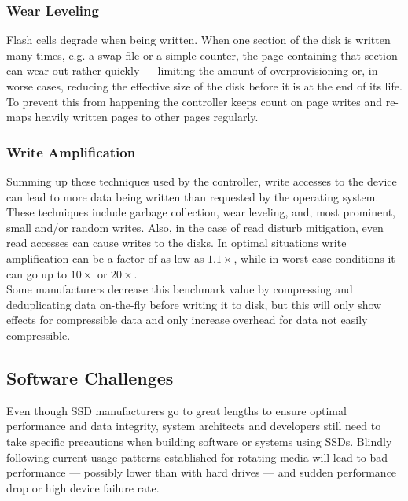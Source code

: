 \documentclass{acm_proc_article-sp}
\begin{document}
\subsubsection*{Wear Leveling}
Flash cells degrade when being written. When one section of the disk is written many times, e.g. a swap file or a simple counter, the page containing that section can wear out rather quickly --- limiting the amount of overprovisioning or, in worse cases, reducing the effective size of the disk before it is at the end of its life. To prevent this from happening the controller keeps count on page writes and re-maps heavily written pages to other pages regularly.

\subsubsection*{Write Amplification}
Summing up these techniques used by the controller, write accesses to the device can lead to more data being written than requested by the operating system. These techniques include garbage collection, wear leveling, and, most prominent, small and/or random writes.
Also, in the case of read disturb mitigation, even read accesses can cause writes to the disks.
In optimal situations write amplification can be a factor of as low as $1.1\times$, while in worst-case conditions it can go up to $10\times$ or $20\times$.
\\
Some manufacturers decrease this benchmark value by compressing and deduplicating data on-the-fly before writing it to disk, but this will only show effects for compressible data and only increase overhead for data not easily compressible.

\subsection{Software Challenges}
Even though SSD manufacturers go to great lengths to ensure optimal performance and data integrity, system architects and developers still need to take specific precautions when building software or systems using SSDs. Blindly following current usage patterns established for rotating media will lead to bad performance --- possibly lower than with hard drives --- and sudden performance drop or high device failure rate.
\end{document}
